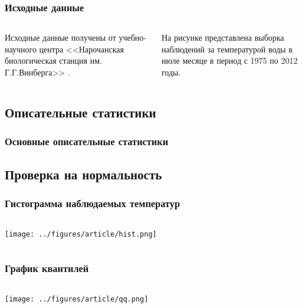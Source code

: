 \documentclass[10pt,pdf,aspectratio=169]{beamer}
\begin{document}
\begin{frame}
  \frametitle{Исходные данные}   %
  \begin{columns}[c]
  \column{2in}  %
  Исходные данные получены от учебно-научного центра <<Нарочанская биологическая станция им. Г.Г.Винберга>> .

  На рисунке представлена выборка наблюдений за температурой воды в июле месяце в период с 1975 по 2012 годы.
  \column{3in}
  \end{columns}
\end{frame}

\subsection{Описательные статистики}

\begin{frame}
  \frametitle{Основные описательные статистики}   %

  

\end{frame}

\subsection{Проверка на нормальность}

\begin{frame}
  \frametitle{Гистограмма наблюдаемых температур}   %
   \begin{columns}[c]
   \column{4.5in}
  \texttt{[image: ../figures/article/hist.png]}
  \end{columns}
\end{frame}

\begin{frame}
  \frametitle{График квантилей}   %
   \begin{columns}[c]
   \column{4.5in}
  \texttt{[image: ../figures/article/qq.png]}
  \end{columns}
\end{frame}
\end{document}
